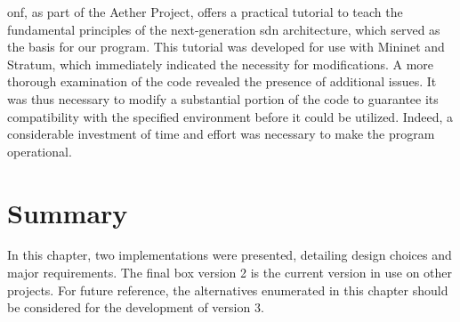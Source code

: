 \gls{onf}, as part of the Aether Project, offers a practical tutorial to teach the fundamental principles of the next-generation \gls{sdn} architecture, which served as the basis for our program. This tutorial was developed for use with Mininet and Stratum, which immediately indicated the necessity for modifications. A more thorough examination of the code revealed the presence of additional issues. It was thus necessary to modify a substantial portion of the code to guarantee its compatibility with the specified environment before it could be utilized. Indeed, a considerable investment of time and effort was necessary to make the program operational.

\section{Summary}
\label{sec:summary}

In this chapter, two implementations were presented, detailing design choices and major requirements. The final box version 2 is the current version in use on other projects. For future reference, the alternatives enumerated in this chapter should be considered for the development of version 3.